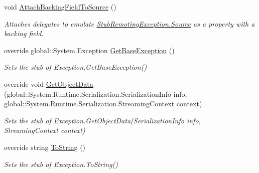 \begin{DoxyCompactItemize}
void \hyperlink{class_system_1_1_runtime_1_1_remoting_1_1_fakes_1_1_stub_remoting_exception_a636ea52b379a6a11a32313abc3d1c557}{Attach\-Backing\-Field\-To\-Source} ()
\begin{DoxyCompactList}\small\item\em Attaches delegates to emulate \hyperlink{class_system_1_1_runtime_1_1_remoting_1_1_fakes_1_1_stub_remoting_exception_a2429920863746582249a9e4f7779c858}{Stub\-Remoting\-Exception.\-Source} as a property with a backing field.\end{DoxyCompactList}\item 
override global\-::\-System.\-Exception \hyperlink{class_system_1_1_runtime_1_1_remoting_1_1_fakes_1_1_stub_remoting_exception_a2efcda89f1b9ba545a2582f4eb2b5cf0}{Get\-Base\-Exception} ()
\begin{DoxyCompactList}\small\item\em Sets the stub of Exception.\-Get\-Base\-Exception()\end{DoxyCompactList}\item 
override void \hyperlink{class_system_1_1_runtime_1_1_remoting_1_1_fakes_1_1_stub_remoting_exception_ab1e7398ea475f4e28ca0b5762306a187}{Get\-Object\-Data} (global\-::\-System.\-Runtime.\-Serialization.\-Serialization\-Info info, global\-::\-System.\-Runtime.\-Serialization.\-Streaming\-Context context)
\begin{DoxyCompactList}\small\item\em Sets the stub of Exception.\-Get\-Object\-Data(\-Serialization\-Info info, Streaming\-Context context)\end{DoxyCompactList}\item 
override string \hyperlink{class_system_1_1_runtime_1_1_remoting_1_1_fakes_1_1_stub_remoting_exception_a67400af820e8b2987ae4fb9dcc7ffa54}{To\-String} ()
\begin{DoxyCompactList}\small\item\em Sets the stub of Exception.\-To\-String()\end{DoxyCompactList}\end{DoxyCompactItemize}
